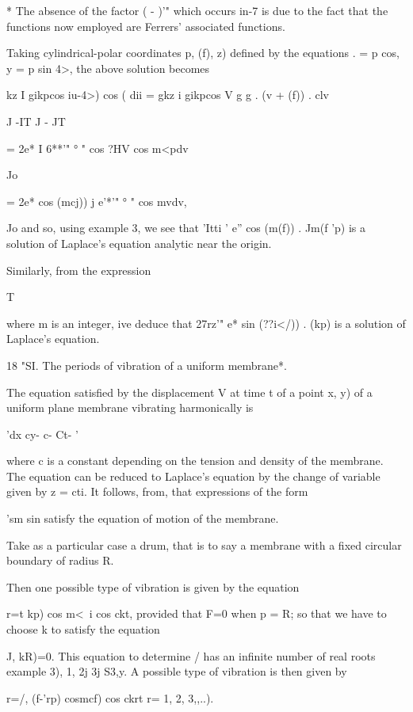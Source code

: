 * The absence of the factor ( - )'" which occurs in-7 is due to
the fact that the functions now employed are Ferrers' associated
functions.

%
%

Taking cylindrical-polar coordinates p, (f), z) defined by the
equations . = p cos, y = p sin 4>, the above solution becomes

 kz I gikpcos iu-4>) cos ( dii = gkz i gikpcos V g g . (v + (f)) . clv

J -IT J - JT

= 2e* I 6**'" ° " cos ?HV cos m<pdv

Jo

= 2e* cos (mcj)) j e'*'" ° " cos mvdv,

Jo and so, using example 3, we see that 'Itti ' e'' cos (m(f))
. Jm(f 'p) is a solution of Laplace's equation analytic near the
origin.

Similarly, from the expression

T

where m is an integer, ive deduce that 27rz'" e* sin (??i</)) . (kp)
is a solution of Laplace's equation.

18 "SI. The periods of vibration of a uniform membrane*.

The equation satisfied by the displacement V at time t of a point x,
y) of a uniform plane membrane vibrating harmonically is

'dx cy- c- Ct- '

where c is a constant depending on the tension and density of the
membrane. The equation can be reduced to Laplace's equation by the
change of variable given by z = cti. It follows, from, that
expressions of the form

'sm sin satisfy the equation of motion of the membrane.

Take as a particular case a drum, that is to say a membrane with a
fixed circular boundary of radius R.

Then one possible type of vibration is given by the equation

r=t kp) cos m<\ i cos ckt, provided that F=0 when p = R; so that we
have to choose k to satisfy the equation

J, kR)=0. This equation to determine / has an infinite number of real
roots  example 3), 1, 2j 3j  S3,y. A possible type of
vibration is then given by

r=/, (f-'rp) cosmcf) cos ckrt r= 1, 2, 3,,..).

